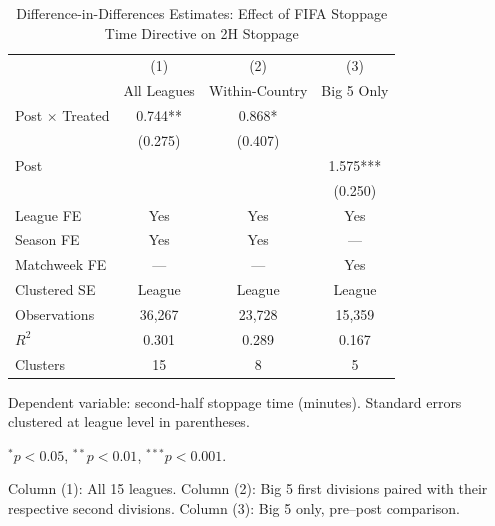 \begin{table}[htbp]
\centering
\caption{Difference-in-Differences Estimates: Effect of FIFA Stoppage Time Directive on 2H Stoppage}
\label{tab:did_results_v3}
\begin{threeparttable}
\begin{tabular}{lccc}
\toprule
 & (1) & (2) & (3) \\
 & All Leagues & Within-Country & Big 5 Only \\
\midrule
Post $\times$ Treated & 0.744** & 0.868* & \\
 & (0.275) & (0.407) & \\
[0.5em]
Post & & & 1.575*** \\
 & & & (0.250) \\
[0.5em]
\midrule
League FE & Yes & Yes & Yes \\
Season FE & Yes & Yes & --- \\
Matchweek FE & --- & --- & Yes \\
Clustered SE & League & League & League \\
\midrule
Observations & 36,267 & 23,728 & 15,359 \\
$R^2$ & 0.301 & 0.289 & 0.167 \\
Clusters & 15 & 8 & 5 \\
\bottomrule
\end{tabular}
\begin{tablenotes}
\small
\item Dependent variable: second-half stoppage time (minutes). Standard errors clustered at league level in parentheses. 
\item $^{*}p<0.05$, $^{**}p<0.01$, $^{***}p<0.001$.
\item Column (1): All 15 leagues. Column (2): Big 5 first divisions paired with their respective second divisions. Column (3): Big 5 only, pre--post comparison.
\end{tablenotes}
\end{threeparttable}
\end{table}